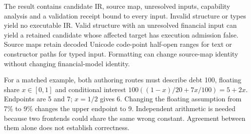 The result contains candidate IR, source map, unresolved inputs, capability
analysis and a validation receipt bound to every input. Invalid structure or
types yield no executable IR. Valid structure with an unresolved financial input
can yield a retained candidate whose affected target has execution admission
false. Source maps retain decoded Unicode code-point half-open ranges for text
or constructor paths for typed input. Formatting can change source-map identity
without changing financial-model identity.

For a matched example, both authoring routes must describe debt 100, floating
share $x\in[0,1]$ and conditional interest
$100((1-x)/20+7x/100)=5+2x$. Endpoints are 5 and 7; $x=1/2$ gives 6. Changing
the floating assumption from 7\% to 9\% changes the upper endpoint to 9.
Independent arithmetic is needed because two frontends could share the same
wrong constant. Agreement between them alone does not establish correctness.
